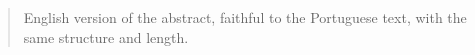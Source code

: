 
\begin{abstract}
  \noindent English version of the abstract, faithful to the Portuguese text, with the same structure and length.
\end{abstract}
